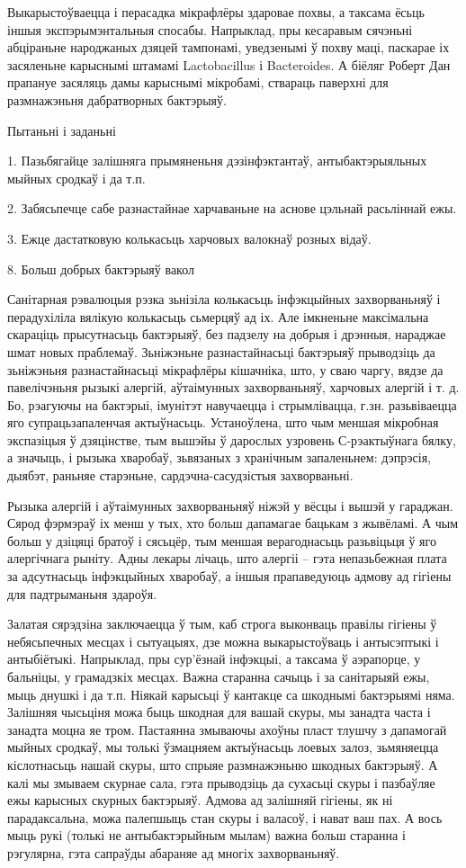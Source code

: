 Выкарыстоўваецца і перасадка мікрафлёры здаровае похвы, а таксама ёсьць іншыя экспэрымэнтальныя спосабы. Напрыклад, пры кесаравым сячэньні абціраньне народжаных дзяцей тампонамі, уведзенымі ў похву маці, паскарае іх засяленьне карыснымі штамамі Lactobacillus і Bacteroides. А біёляг Роберт Дан прапануе засяляць дамы карыснымі мікробамі, ствараць паверхні для размнажэньня дабратворных бактэрыяў.

Пытаньні і заданьні

1. Пазьбягайце залішняга прымяненьня дэзінфэктантаў, антыбактэрыяльных мыйных сродкаў і да т.п.

2. Забясьпечце сабе разнастайнае харчаваньне на аснове цэльнай расьліннай ежы.

3. Ежце дастатковую колькасьць харчовых валокнаў розных відаў.


8. Больш добрых бактэрыяў вакол

Санітарная рэвалюцыя рэзка зьнізіла колькасьць інфэкцыйных захворваньняў і перадухіліла вялікую колькасьць сьмерцяў ад іх. Але імкненьне максімальна скараціць прысутнасьць бактэрыяў, без падзелу на добрыя і дрэнныя, нараджае шмат новых праблемаў. Зьніжэньне разнастайнасьці бактэрыяў прыводзіць да зьніжэньня разнастайнасьці мікрафлёры кішачніка, што, у сваю чаргу, вядзе да павелічэньня рызыкі алергій, аўтаімунных захворваньняў, харчовых алергій і т. д. Бо, рэагуючы на бактэрыі, імунітэт навучаецца і стрымлівацца, г.зн. разьвіваецца яго супрацьзапаленчая актыўнасьць. Устаноўлена, што чым меншая мікробная экспазіцыя ў дзяцінстве, тым вышэйы ў дарослых узровень С-рэактыўнага бялку, а значыць, і рызыка хваробаў, зьвязаных з хранічным запаленьнем: дэпрэсія, дыябэт, раньняе старэньне, сардэчна-сасудзістыя захворваньні.

Рызыка алергій і аўтаімунных захворваньняў ніжэй у вёсцы і вышэй у гараджан. Сярод фэрмэраў іх менш у тых, хто больш дапамагае бацькам з жывёламі. А чым больш у дзіцяці братоў і сясьцёр, тым меншая верагоднасьць разьвіцьця ў яго алергічнага рыніту. Адны лекары лічаць, што алергіі – гэта непазьбежная плата за адсутнасьць інфэкцыйных хваробаў, а іншыя прапаведуюць адмову ад гігіены для падтрыманьня здароўя.

Залатая сярэдзіна заключаецца ў тым, каб строга выконваць правілы гігіены ў небясьпечных месцах і сытуацыях, дзе можна выкарыстоўваць і антысэптыкі і антыбіётыкі. Напрыклад, пры сур'ёзнай інфэкцыі, а таксама ў аэрапорце, у бальніцы, у грамадзкіх месцах. Важна старанна сачыць і за санітарыяй ежы, мыць днушкі і да т.п. Ніякай карысьці ў кантакце са шкоднымі бактэрыямі няма. Залішняя чысьціня можа быць шкодная для вашай скуры, мы занадта часта і занадта моцна яе тром. Пастаянна змываючы ахоўны пласт тлушчу з дапамогай мыйных сродкаў, мы толькі ўзмацняем актыўнасьць лоевых залоз, зьмяняецца кіслотнасьць нашай скуры, што спрыяе размнажэньню шкодных бактэрыяў. А калі мы змываем скурнае сала, гэта прыводзіць да сухасьці скуры і пазбаўляе ежы карысных скурных бактэрыяў. Адмова ад залішняй гігіены, як ні парадаксальна, можа палепшыць стан скуры і валасоў, і нават ваш пах. А вось мыць рукі (толькі не антыбактэрыйным мылам) важна больш старанна і рэгулярна, гэта сапраўды абараняе ад многіх захворваньняў.

